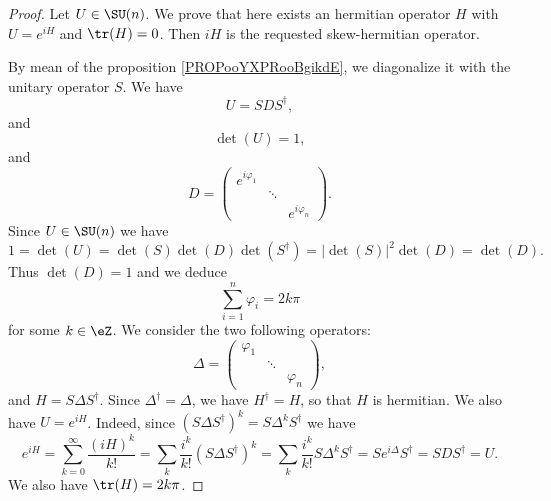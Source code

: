 \begin{proof}
	Let \( U\in \SU(n)\). We prove that here exists an hermitian operator \( H\) with \( U= e^{iH}\) and \( \tr(H)=0\). Then \( iH\) is the requested skew-hermitian operator.

	By mean of the proposition \ref{PROPooYXPRooBgikdE}, we diagonalize it with the unitary operator \( S\). We have
	\begin{equation}
		U=SDS^{\dag},
	\end{equation}
	and
	\begin{equation}
		\det(U)=1,
	\end{equation}
	and
	\begin{equation}
		D=\begin{pmatrix}
			e^{i\varphi_1} &        &                \\
			               & \ddots &                \\
			               &        & e^{i\varphi_n}
		\end{pmatrix}.
	\end{equation}
	Since \( U\in\SU(n)\) we have
	\begin{equation}
		1=\det(U)=\det(S)\det(D)\det(S^{\dag})=| \det(S) |^2\det(D)=\det(D).
	\end{equation}
	Thus \( \det(D)=1\) and we deduce
	\begin{equation}
		\sum_{i=1}^n\varphi_i=2k\pi
	\end{equation}
	for some \( k\in \eZ\). We consider the two following  operators:
	\begin{equation}
		\Delta=\begin{pmatrix}
			\varphi_1 &        &           \\
			          & \ddots &           \\
			          &        & \varphi_n
		\end{pmatrix},
	\end{equation}
	and \( H=S\Delta S^{\dag}\). Since \( \Delta^{\dag}=\Delta\), we have \( H^{\dag}=H\), so that \( H\) is hermitian. We also have \( U= e^{iH}\). Indeed, since \( (S\Delta S^{\dag})^k=S\Delta^kS^{\dag}\) we have
	\begin{equation}
		e^{iH}=\sum_{k=0}^{\infty}\frac{ (iH)^k }{ k! }=\sum_k\frac{ i^k }{ k! }(S\Delta S^{\dag})^k=\sum_k\frac{ i^k }{ k! }S\Delta^kS^{\dag}=S e^{i\Delta}S^{\dag}=SDS^{\dag}=U.
	\end{equation}
	We also have \( \tr(H)=2k\pi\).


\end{proof}
